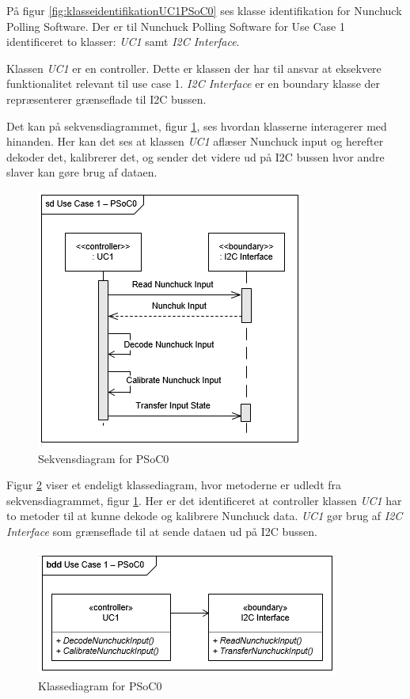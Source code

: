 På figur \ref{fig:klasseidentifikationUC1PSoC0} ses klasse identifikation for Nunchuck Polling Software. Der er til Nunchuck Polling Software for Use Case 1 identificeret to klasser: \textit{UC1} samt \textit{I2C Interface}. \newline

\noindent Klassen \textit{UC1} er en controller. Dette er klassen der har til ansvar at eksekvere funktionalitet relevant til use case 1. \textit{I2C Interface} er en boundary klasse der repræsenterer grænseflade til I2C bussen.

Det kan på sekvensdiagrammet, figur \ref{fig:sekvensUC1PSoC0}, ses hvordan klasserne interagerer med hinanden. Her kan det ses at klassen \textit{UC1} aflæser Nunchuck input og herefter dekoder det, kalibrerer det, og sender det videre ud på I2C bussen hvor andre slaver kan gøre brug af dataen.

\begin{figure}[H]
	\centering
	\includegraphics[scale=0.8]{Systemarkitektur/images/UC1PSoC0SequenceDiagram}
	\caption{Sekvensdiagram for PSoC0}
	\label{fig:sekvensUC1PSoC0}
\end{figure}

Figur \ref{fig:klasseUC1PSoC0} viser et endeligt klassediagram, hvor metoderne er udledt fra sekvensdiagrammet, figur \ref{fig:sekvensUC1PSoC0}. Her er det identificeret at controller klassen \textit{UC1} har to metoder til at kunne dekode og kalibrere Nunchuck data. \textit{UC1} gør brug af \textit{I2C Interface} som grænseflade til at sende dataen ud på I2C bussen.

\begin{figure}[H]
	\centering
	\includegraphics[scale=0.8]{Systemarkitektur/images/klasseUC1PSoC0}
	\caption{Klassediagram for PSoC0}
	\label{fig:klasseUC1PSoC0}
\end{figure}

